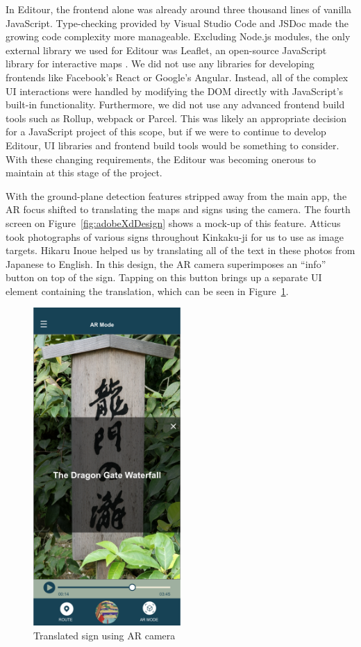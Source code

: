 \documentclass[a4paper, 10pt, american, titlepage]{article}
\begin{document}
In Editour, the frontend alone was already around three thousand lines of
vanilla JavaScript. Type-checking provided by Visual Studio Code and JSDoc made
the growing code complexity more manageable. Excluding Node.js modules, the only
external library we used for Editour was Leaflet, an open-source JavaScript
library for interactive maps \autocite{leafletjs}. We did not use any libraries
for developing frontends like Facebook's React or Google's Angular. Instead,
all of the complex UI interactions were handled by modifying the DOM directly
with JavaScript's built-in functionality. Furthermore, we did not use any
advanced frontend build tools such as Rollup, webpack or Parcel. This was
likely an appropriate decision for a JavaScript project of this scope, but if
we were to continue to develop Editour, UI libraries and frontend build tools
would be something to consider. With these changing requirements, the Editour
was becoming onerous to maintain at this stage of the project.

With the ground-plane detection features stripped away from the main app, the
AR focus shifted to translating the maps and signs using the camera. The fourth
screen on Figure~\ref{fig:adobeXdDesign} shows a mock-up of this feature.
Atticus took photographs of various signs throughout Kinkaku-ji for us to use as
image targets. Hikaru Inoue helped us by translating all of the text in these
photos from Japanese to English. In this design, the AR camera superimposes an
``info'' button on top of the sign. Tapping on this button brings up a separate
UI element containing the translation, which can be seen in
Figure~\ref{fig:signTranslation}.

\begin{figure}[h] \centering
    \includegraphics[width=0.5\textwidth]{sign-translation.png}
    \caption{Translated sign using AR camera}
    \label{fig:signTranslation}
\end{figure}
\end{document}
